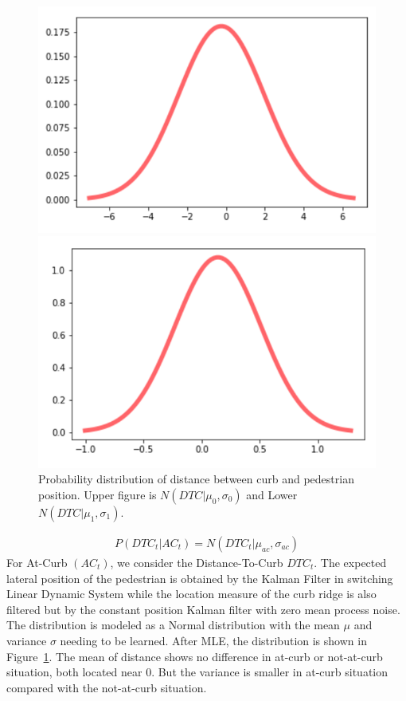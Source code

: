 \documentclass[10pt,twocolumn,letterpaper]{article}
\begin{document}
    \begin{figure}[t]
        \begin{center}
           \includegraphics[width=0.9\linewidth]{images/ac0.png}
        \end{center}
        \begin{center}
            \includegraphics[width=0.9\linewidth]{images/ac1.png}
         \end{center}
        \caption{Probability distribution of distance between curb and pedestrian position. Upper
        figure is $N(DTC|\mu_{0}, \sigma_{0})$ and Lower $N(DTC|\mu_{1}, \sigma_{1})$.}
        \label{fig:long}
        \label{fig:onecol}
        \label{ac}
    \end{figure}
    \begin{eqnarray*}
        P(DTC_t|AC_t) = N(DTC_t|\mu_{ac}, \sigma_{ac})
    \end{eqnarray*}
    For At-Curb $(AC_t)$, we consider the Distance-To-Curb $DTC_t$. The expected
    lateral position of the pedestrian is obtained by the Kalman Filter in switching
    Linear Dynamic System while the location measure of the curb ridge is also
    filtered but by the constant position Kalman filter with zero mean process
    noise. The distribution is modeled as a Normal distribution with the mean
    $\mu$ and variance $\sigma$ needing to be learned. After MLE, the distribution
    is shown in Figure~\ref{ac}. The mean of distance 
    shows no difference in at-curb or not-at-curb situation, both located near 0. 
    But the variance is smaller in at-curb situation compared with the not-at-curb situation.
\end{document}
